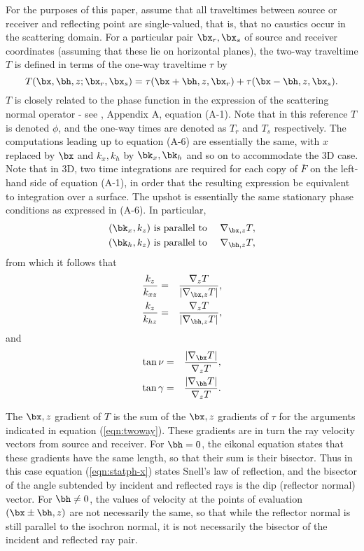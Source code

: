 For the purposes of this paper, assume that all traveltimes between source or receiver and reflecting point are single-valued, that is, that no caustics occur in the scattering domain. For a particular pair $\bx_r,\bx_s$ of source and receiver coordinates (assuming that these lie on horizontal planes), the two-way traveltime $T$ is defined in terms of the one-way traveltime $\tau$ by
\begin{equation}
\label{eqn:twoway}
T(\bx,\bh,z;\bx_r,\bx_s) = \tau(\bx+\bh,z,\bx_r) + \tau(\bx-\bh,z,\bx_s).
\end{equation}
$T$ is closely related to the phase function in the expression of the scattering normal operator - see \cite{HouSymes:15}, Appendix A, equation (A-1). Note that in this reference $T$ is denoted $\phi$, and the one-way times are denoted as $T_r$ and $T_s$ respectively. The computations leading up to equation (A-6) are essentially the same, with $x$ replaced by $\bx$ and $k_x,k_h$ by $\bk_x,\bk_h$ and so on to accommodate the 3D case. Note that in 3D, two time integrations are required for each copy of $\bar{F}$ on the left-hand side of equation (A-1), in order that the resulting expression be equivalent to integration over a surface. The upshot is essentially the same stationary phase conditions as expressed in (A-6). In particular,
\begin{eqnarray}
\label{eqn:statph-x}
(\bk_x,k_z) &\mbox{ is parallel to }& \nabla_{\bx,z} T,\\
\label{eqn:statph-h}
(\bk_h,k_z) &\mbox{ is parallel to }& \nabla_{\bh,z} T,
\end{eqnarray}
from which it follows that
\begin{eqnarray}
\label{eqn:statphquot-x}
\frac{k_z}{k_{xz}} & = & \frac{\nabla_z T}{|\nabla_{\bx,z}T|},\\
\label{eqn:statphquot-h}
\frac{k_z}{k_{hz}} & = & \frac{\nabla_z T}{|\nabla_{\bh,z}T|},
\end{eqnarray}
and
\begin{eqnarray}
\label{eqn:statphquot-x-tan}
\tan \nu & = & \frac {|\nabla_{\bx}T|}{\nabla_z T},\\
\label{eqn:statphquot-h-tan}
\tan \gamma & = & \frac {|\nabla_{\bh}T|}{\nabla_z T}.
\end{eqnarray}

The $\bx,z$ gradient of $T$ is the sum of the $\bx,z$ gradients of $\tau$ for the arguments indicated in equation (\ref{eqn:twoway}). These gradients are in turn the ray velocity vectors from source and receiver. 
For $\bh=0$, the eikonal equation states that these gradients have the same length, so that their sum is their bisector. Thus in this case equation (\ref{eqn:statph-x}) states Snell's law of reflection, and the bisector of the angle subtended by incident and reflected rays is the dip (reflector normal) vector. For $\bh \ne 0$, the values of velocity at the points of evaluation $(\bx \pm \bh,z)$ are not necessarily the same, so that while the reflector normal is still parallel to the isochron normal, it is not necessarily the bisector of the incident and reflected ray pair.

